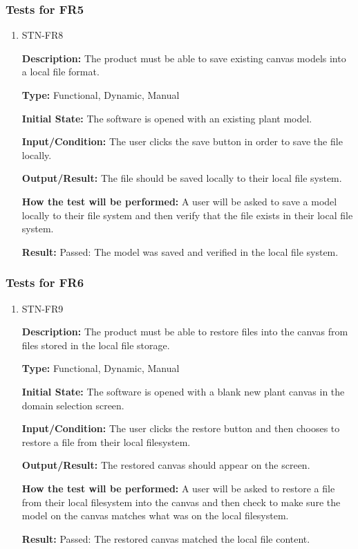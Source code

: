 \documentclass[12pt, titlepage]{article}
\begin{document}
\subsubsection{Tests for FR5}
\begin{enumerate}
\item{STN-FR8\\}

\textbf{Description:} The product must be able to save existing canvas models into a local file format.

\textbf{Type:} Functional, Dynamic, Manual

\textbf{Initial State:} The software is opened with an existing plant model.

\textbf{Input/Condition:} The user clicks the save button in order to save the file locally.

\textbf{Output/Result:} The file should be saved locally to their local file system.

\textbf{How the test will be performed:} A user will be asked to save a model locally to their file system and then verify that the file exists in their local file system.

\textbf{Result:} Passed: The model was saved and verified in the local file system.

\end{enumerate}

\subsubsection{Tests for FR6}
\begin{enumerate}
\item{STN-FR9\\}

\textbf{Description:} The product must be able to restore files into the canvas from files stored in the local file storage.

\textbf{Type:} Functional, Dynamic, Manual

\textbf{Initial State:} The software is opened with a blank new plant canvas in the domain selection screen.

\textbf{Input/Condition:} The user clicks the restore button and then chooses to restore a file from their local filesystem.

\textbf{Output/Result:} The restored canvas should appear on the screen.

\textbf{How the test will be performed:} A user will be asked to restore a file from their local filesystem into the canvas and then check to make sure the model on the canvas matches what was on the local filesystem.

\textbf{Result:} Passed: The restored canvas matched the local file content.

\end{enumerate}
\end{document}
